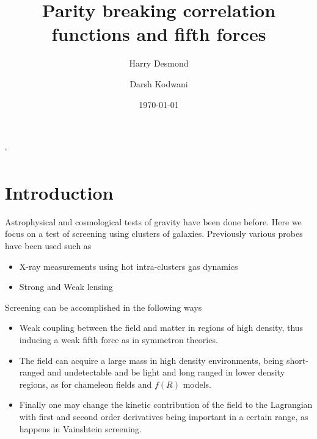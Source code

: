 \documentclass[aps,showpacs,onecolumn,floats,prd,superscriptaddress,nofootinbib]{revtex4-1}
\begin{document}
\title{\textbf{Parity breaking correlation functions and fifth forces}}

\author{Harry Desmond}
%

\author{Darsh Kodwani}
%

\date{\today}%
`
\begin{abstract}

\end{abstract}

\maketitle

\section{Introduction}

Astrophysical and cosmological tests of gravity have been done before. 
Here we focus on a test of screening using clusters of galaxies. 
Previously various probes have been used such as 

\begin{itemize}

\item X-ray measurements using hot intra-clusters gas dynamics
\item Strong and Weak lensing

\end{itemize}

Screening can be accomplished in the following ways

\begin{itemize}

\item Weak coupling between the field and matter in regions of high density, thus inducing a weak fifth force as in symmetron theories. 

\item The field can acquire a large mass in high density environments, being short-ranged and undetectable and be light and long ranged in lower density regions, as for chameleon fields and $f(R)$ models. 

\item Finally one may change the kinetic contribution of the field to the Lagrangian with first and second order derivatives being important in a certain range, as happens in Vainshtein screening. 

\end{itemize}
\end{document}
